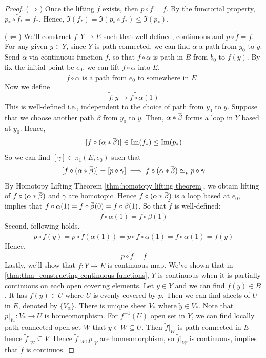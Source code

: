 \documentclass[12pt, a4paper, twoside]{article}
\newcommand{\overbar}[1]{\mkern 1.5mu\overline{\mkern-1.5mu#1\mkern-1.5mu}\mkern 1.5mu}
\theoremstyle{plain}
\begin{document}
\begin{proof}
    ($\Rightarrow$) Once the lifting $\tilde{f}$ exists, then $p \circ \tilde{f} = f$. 
    By the functorial property, $p_* \circ \tilde{f}_* = f_*$. 
    Hence, $\Im(f_*) = \Im(p_* \circ f_*) \leq \Im(p_*)$. 

    ($\Leftarrow$) We'll construct $\tilde{f}: Y \rightarrow E$ such that well-defined, continuous 
    and $p \circ \tilde{f} = f$. 
    For any given $y \in Y$, since $Y$ is path-connected, we can find $\alpha$ a path from $y_0$ to $y$. 
    Send $\alpha$ via continuous function $f$, so that $f \circ \alpha$ is path in $B$ from $b_0$ to $f(y)$. 
    By fix the initial point be $e_0$, we can lift $f \circ \alpha$ into $E$, 
    \[\widetilde{f \circ \alpha} \text{ is a path from $e_0$ to somewhere in $E$ }\]
    Now we define 
    \[\tilde{f} : y \mapsto \widetilde{f \circ \alpha}(1)\]
    This is well-defined i.e., independent to the choice of path from $y_0$ to $y$. 
    Suppose that we choose another path $\beta$ from $y_0$ to $y$. 
    Then, $\alpha * \overbar{\beta}$ forms a loop in $Y$ based at $y_0$. 
    Hence, 
    \[[f \circ (\alpha * \overbar{\beta})] \in \Im(f_*) \leq \Im(p_*)\]
    So we can find $[\gamma] \in \pi_1(E, e_0)$ such that 
    \[[f \circ (\alpha * \overbar{\beta})] = [p \circ \gamma] \implies f \circ (\alpha * \overbar{\beta}) \simeq_p p \circ \gamma\]
    By Homotopy Lifting Theorem \ref{thm:homotopy lifting theorem}, we obtain lifting of $f \circ (\alpha * \overbar{\beta})$ and $\gamma$ are homotopic. 
    Hence $f \circ (\alpha * \overbar{\beta})$ is a loop based at $e_0$, implies that $f \circ \alpha(1) = f \circ \overbar{\beta}(0) = f \circ \beta(1)$. 
    So that $\tilde{f}$ is well-defined: 
    \[\widetilde{f \circ \alpha}(1) = \widetilde{f \circ \beta}(1)\]
    Second, following holds. 
    \[p \circ \tilde{f}(y) = p \circ \tilde{f}(\alpha(1)) = p \circ \widetilde{f \circ \alpha}(1) = f \circ \alpha(1) = f(y)\]
    Hence, 
    \[p \circ \tilde{f} = f\]
    Lastly, we'll show that $\tilde{f}: Y \rightarrow E$ is continuous map. 
    We've shown that in \ref{thm:thm_constructing continuous functions}, $Y$ is continuous 
    when it is partially continuous on each open covering elements. 
    Let $y \in Y$ and we can find $f(y) \in B$. It has $f(y) \in U$ where $U$ is evenly covered by $p$. 
    Then we can find sheets of $U$ in $E$, denoted by $\{V_\alpha\}$. 
    There is unique sheet $V_*$ where $\tilde{y} \in V_*$. Note that $p|_{V_*} : V_* \rightarrow U$ is 
    homeomorphism. For $f^{-1}(U)$ open set in $Y$, we can find locally path connected open set $W$ that $y \in W \subseteq U$. 
    Then $\tilde{f}|_W$ is path-connected in $E$ hence $\tilde{f}|_W \subseteq V$. Hence 
    $\tilde{f}|_W, p|_V$ are homeomorphism, so $\tilde{f}|_W$ is continuous, implies that $\tilde{f}$ is continuos.
\end{proof}
\end{document}
